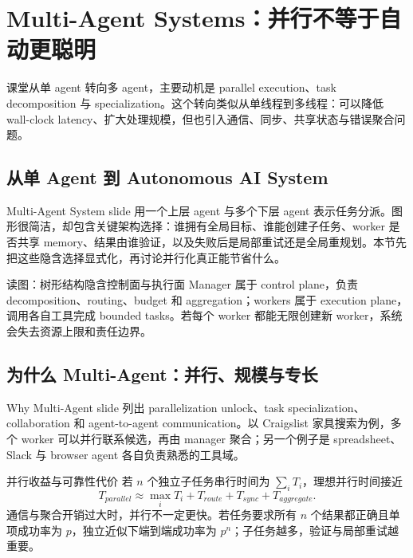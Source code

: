 \section{Multi-Agent Systems：并行不等于自动更聪明}

课堂从单 agent 转向多 agent，主要动机是 parallel execution、task decomposition 与 specialization。这个转向类似从单线程到多线程：可以降低 wall-clock latency、扩大处理规模，但也引入通信、同步、共享状态与错误聚合问题。

\subsection{从单 Agent 到 Autonomous AI System}

Multi-Agent System slide 用一个上层 agent 与多个下层 agent 表示任务分派。图形很简洁，却包含关键架构选择：谁拥有全局目标、谁能创建子任务、worker 是否共享 memory、结果由谁验证，以及失败后是局部重试还是全局重规划。本节先把这些隐含选择显式化，再讨论并行化真正能节省什么。


\begin{knowledgebox}{读图：树形结构隐含控制面与执行面}
Manager 属于 control plane，负责 decomposition、routing、budget 和 aggregation；workers 属于 execution plane，调用各自工具完成 bounded tasks。若每个 worker 都能无限创建新 worker，系统会失去资源上限和责任边界。
\end{knowledgebox}


\subsection{为什么 Multi-Agent：并行、规模与专长}

Why Multi-Agent slide 列出 parallelization unlock、task specialization、collaboration 和 agent-to-agent communication。以 Craigslist 家具搜索为例，多个 worker 可以并行联系候选，再由 manager 聚合；另一个例子是 spreadsheet、Slack 与 browser agent 各自负责熟悉的工具域。


\begin{importantbox}{并行收益与可靠性代价}
若 $n$ 个独立子任务串行时间为 $\sum_i T_i$，理想并行时间接近
\[
T_{parallel}\approx \max_i T_i+T_{route}+T_{sync}+T_{aggregate}.
\]
通信与聚合开销过大时，并行不一定更快。若任务要求所有 $n$ 个结果都正确且单项成功率为 $p$，独立近似下端到端成功率为 $p^n$；子任务越多，验证与局部重试越重要。
\end{importantbox}

